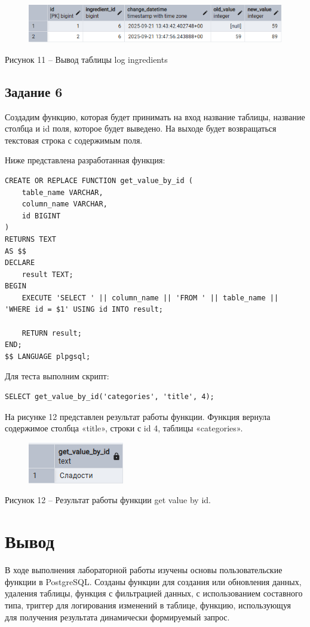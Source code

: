 \documentclass[a4paper,14pt]{extarticle}
\begin{document}
  \begin{figure}[h]
    \centering
    \includegraphics[width=1\linewidth]{img/t-5-1}
  \end{figure}
  \begin{center}
    Рисунок 11 – Вывод таблицы log ingredients
  \end{center}

  \subsection*{Задание 6}
  Создадим функцию, которая будет принимать на вход название таблицы, название столбца и id поля, которое будет выведено. На выходе будет возвращаться текстовая строка с содержимым поля.

  Ниже представлена разработанная функция:

  \noindent
  \begin{Verbatim}[tabsize=4,fontsize=\small]
CREATE OR REPLACE FUNCTION get_value_by_id (
    table_name VARCHAR,
    column_name VARCHAR,
    id BIGINT
)
RETURNS TEXT
AS $$
DECLARE
    result TEXT;
BEGIN
    EXECUTE 'SELECT ' || column_name || 'FROM ' || table_name || 'WHERE id = $1' USING id INTO result;

    RETURN result;
END;
$$ LANGUAGE plpgsql;
  \end{Verbatim}

  Для теста выполним скрипт:

  \noindent
  \begin{Verbatim}[tabsize=4,fontsize=\small]
SELECT get_value_by_id('categories', 'title', 4);
  \end{Verbatim}

  На рисунке 12 представлен результат работы функции. Функция вернула содержимое столбца «title», строки с id 4, таблицы «categories».

  \begin{figure}[h]
    \centering
    \includegraphics[width=0.25\linewidth]{img/t-6-1}
  \end{figure}
  \begin{center}
    Рисунок 12 – Результат работы функции get value by id.
  \end{center}

  \section*{Вывод}
  В ходе выполнения лабораторной работы изучены основы пользовательские функции в PostgreSQL. Созданы функции для создания или обновления данных, удаления таблицы, функция с фильтрацией данных, с использованием составного типа, триггер для логирования изменений в таблице, функцию, использующуя для получения результата динамически формируемый запрос.
\end{document}
